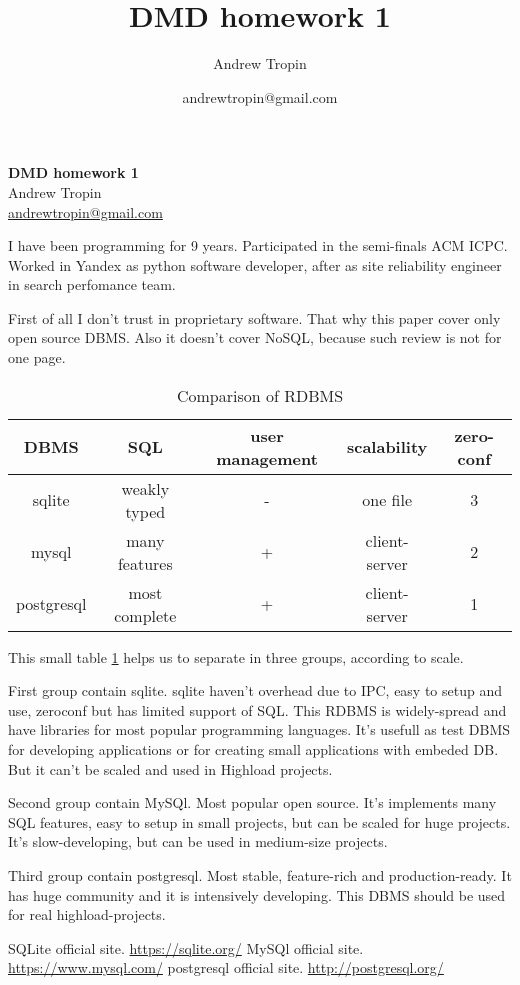 \documentclass[a4paper,12pt]{article}
\title{DMD homework 1}
\author{Andrew Tropin}
\date{andrewtropin@gmail.com}
\begin{document}
  \begin{center}
    \textbf{DMD homework 1} \\
    Andrew Tropin \\
    \href{mailto:andrewtropin@gmail.com}{andrewtropin@gmail.com} \\
  \end{center}

  I have been programming for 9 years. Participated in the semi-finals
  ACM ICPC. Worked in Yandex as python software developer, after as site
  reliability engineer in search perfomance team.

  First of all I don't trust in proprietary software. That why this paper
  cover only open source DBMS. Also it doesn't cover NoSQL, because
  such review is not for one page.

  \begin{table}[h]
    \centering
    \label{tabel:RDBMS}
    \begin{tabular}{c|c|c|c|c}
      DBMS       & SQL           & user management & scalability   & zero-conf \\
      \hline
      sqlite     & weakly typed  & -               & one file      & 3 \\
      mysql      & many features & +               & client-server & 2 \\
      postgresql & most complete & +               & client-server & 1 \\
    \end{tabular}
    \caption{Comparison of RDBMS}
  \end{table}

  This small table \ref{tabel:RDBMS} helps us to separate in three groups,
  according to scale.

  First group contain sqlite.
  sqlite haven't overhead due to IPC, easy to setup and use, zeroconf but
  has limited support of SQL. This RDBMS is widely-spread and have libraries
  for most popular programming languages.
  It's usefull as test DBMS for developing applications or for creating
  small applications with embeded DB. But it can't be scaled and used in
  Highload projects.

  Second group contain MySQl. Most popular open source. It's implements
  many SQL features, easy to setup in small projects, but can be scaled
  for huge projects. It's slow-developing, but can be used in medium-size
  projects.

  Third group contain postgresql. Most stable, feature-rich and
  production-ready. It has huge community and it is intensively developing.
  This DBMS should be used for real highload-projects.

\begin{thebibliography}{99}
   SQLite official site. \href{https://sqlite.org/}{https://sqlite.org/}
   MySQl official site. \href{https://www.mysql.com/}{https://www.mysql.com/}
   postgresql official site. \href{http://postgresql.org/}{http://postgresql.org/}
\end{thebibliography}
\end{document}
